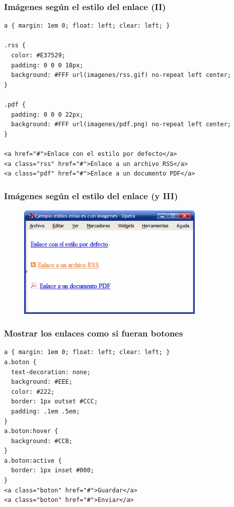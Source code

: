\begin{frame}[fragile]
\frametitle{Imágenes según el estilo del enlace (II)}

\begin{footnotesize}
\begin{verbatim}
a { margin: 1em 0; float: left; clear: left; }
 
.rss {
  color: #E37529;
  padding: 0 0 0 18px;
  background: #FFF url(imagenes/rss.gif) no-repeat left center;
}
 
.pdf {
  padding: 0 0 0 22px;
  background: #FFF url(imagenes/pdf.png) no-repeat left center;
}
 
<a href="#">Enlace con el estilo por defecto</a>
<a class="rss" href="#">Enlace a un archivo RSS</a>
<a class="pdf" href="#">Enlace a un documento PDF</a>
\end{verbatim}
\end{footnotesize}

\end{frame}


\begin{frame}
\frametitle{Imágenes según el estilo del enlace (y III)}


\begin{center}
\begin{figure}[p]
\includegraphics[width=0.8\textwidth]{figs/f0704.png}
\end{figure}
\end{center}

\end{frame}



\begin{frame}[fragile]
\frametitle{Mostrar los enlaces como si fueran botones}

\begin{footnotesize}
\begin{verbatim}
a { margin: 1em 0; float: left; clear: left; }
a.boton {
  text-decoration: none;
  background: #EEE;
  color: #222;
  border: 1px outset #CCC;
  padding: .1em .5em;
}
a.boton:hover {
  background: #CCB;
}
a.boton:active {
  border: 1px inset #000;
}
<a class="boton" href="#">Guardar</a>
<a class="boton" href="#">Enviar</a>
\end{verbatim}
\end{footnotesize}

\end{frame}



